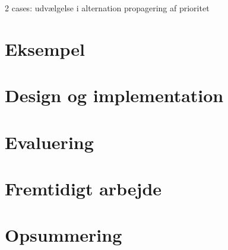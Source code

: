 2 cases:
udvælgelse i alternation
propagering af prioritet


  \section{Eksempel}
  \section{Design og implementation}
  \section{Evaluering}
  \section{Fremtidigt arbejde}
  \section{Opsummering}

